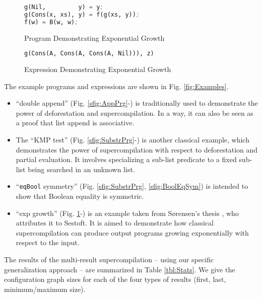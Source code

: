 \documentclass[submission,copyright,creativecommons]{eptcs}
\begin{document}
\begin{figure*}
\begin{subfigure}[b]{\linewidth}
\begin{lstlisting}[language=Lisp,keywords={}]
g(Nil,         y) = y;
g(Cons(x, xs), y) = f(g(xs, y));
f(w) = B(w, w);
\end{lstlisting}
\caption{Program Demonstrating Exponential Growth}
\label{sfig:ExpGrowthPrg}
\end{subfigure}

\begin{subfigure}[b]{\linewidth}
\begin{lstlisting}[language=Lisp,keywords={}]
g(Cons(A, Cons(A, Cons(A, Nil))), z)
\end{lstlisting}
\caption{Expression Demonstrating Exponential Growth}
\label{sfig:ExpGrowth}
\end{subfigure}

\caption{Example Programs}\label{fig:Examples}
\end{figure*}

The example programs and expressions are shown in Fig. \ref{fig:Examples}.
\begin{itemize}
  \item ``double append'' (Fig. \ref{sfig:AppPrg}-) is traditionally used to 
    demonstrate the power of deforestation and supercompilation.
    In a way, it can also be seen as a proof that list append is associative.
  \item The ``KMP test'' (Fig. \ref{sfig:SubstrPrg}-) is another classical example, 
    which demonstrates the power of supercompilation with respect to deforestation and partial evaluation.
    It involves specializing a sub-list predicate to a fixed sub-list being
    searched in an unknown list.
  \item ``\verb|eqBool| symmetry'' (Fig. \ref{sfig:SubstrPrg}, \ref{sfig:BoolEqSym}) is intended
    to show that Boolean equality is symmetric.
  \item ``exp growth'' (Fig. \ref{sfig:ExpGrowthPrg}-) is an example taken 
    from S{\o}rensen's thesis \cite[Example 11.4.1]{Sorensen1994TurchinSupercompiler}, who attributes it to Sestoft.
    It is aimed to demonstrate how classical supercompilation can produce output programs
    growing exponentially with respect to the input.
\end{itemize}

The results of the multi-result supercompilation -- using our specific generalization approach --
are summarized in Table \ref{tbl:Stats}.
We give the configuration graph sizes for each of the four types of results (first, last, minimum/maximum size).
\end{document}
